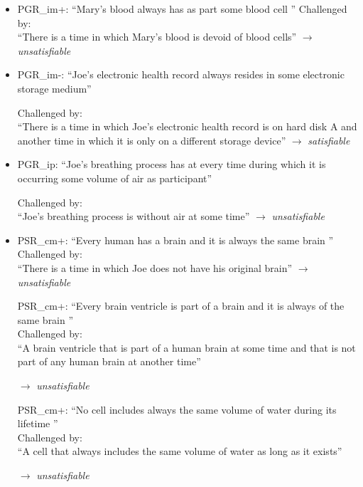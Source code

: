 \begin{itemize}
\item PGR\_im+: ``Mary's blood always has as part some blood cell ''
Challenged by: \\``There is a time in which Mary's blood is devoid of blood cells''  
$\rightarrow$ \emph{unsatisfiable}

\item PGR\_im-: ``Joe's electronic health record always resides in some electronic storage medium''

Challenged by: \\``There is a time in which Joe's electronic health record is on hard disk A and another time in which it is only on a different storage device''  
$\rightarrow$ \emph{satisfiable}


\item PGR\_ip:  ``Joe's breathing process has at every time during which it is occurring some volume of air as participant''

Challenged by: \\``Joe's breathing process is without air at some time''  
$\rightarrow$ \emph{unsatisfiable}


\item 
PSR\_cm+: ``Every human has a brain and it is always the same brain ''\\
Challenged by: \\``There is a time in which Joe does not have his original brain''  
$\rightarrow$ \emph{unsatisfiable}

PSR\_cm+: ``Every brain ventricle is part of a brain and it is always of the same brain ''\\
Challenged by: \\``A brain ventricle that is part of a human brain at some time 
and that is not part of any human brain at another time''
 
$\rightarrow$ \emph{unsatisfiable}

PSR\_cm+: ``No cell includes always the same volume of water during its lifetime ''\\
Challenged by: \\``A cell that always includes the same volume of water as long as it exists''
 
$\rightarrow$ \emph{unsatisfiable}





\end{itemize}
